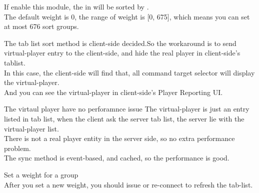
If enable this module, the  in  will be sorted by .
\\
The default weight is 0, the range of weight is [0, 675], which means you can set at most 676 sort groups.

The tab list sort method is client-side decided.So the workaround is to send virtual-player entry to the client-side, and hide the real player in client-side's tablist.
\\
In this case, the client-side will find that, all command target selector will display the virtual-player.
\\
And you can see the virtual-player in client-side's Player Reporting UI.

\begin{note}{The virtaul player have no perforamnce issue}
    The virtual-player is just an entry listed in tab list, when the client ask the server tab list, the server lie with the virtual-player list.
    \\
    There is not a real player entity in the server side, so no extra performance problem.
    \\
    The sync method is event-based, and cached, so the performance is good.
\end{note}

\begin{example}{Set a weight for a group}
    \\
    After you set a new weight, you should issue  or re-connect to refresh the tab-list.
\end{example}



